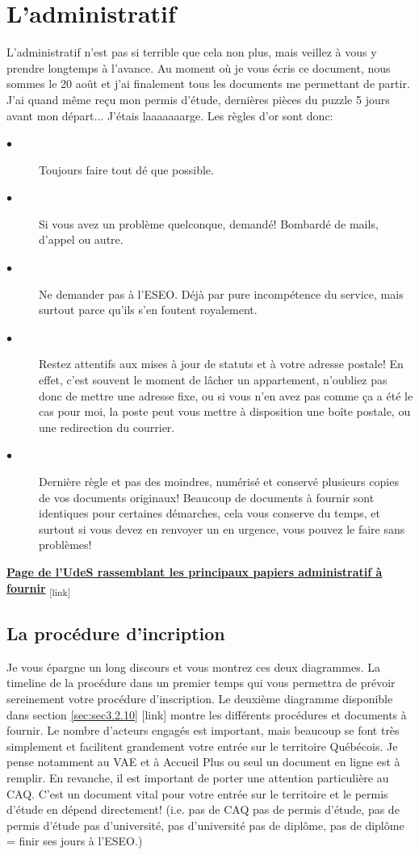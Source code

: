 \section{L'administratif}\label{sec:sec3.2}
L'administratif n'est pas si terrible que cela non plus, mais veillez à vous y prendre longtemps à l'avance. Au moment où je vous écris ce document, nous sommes le 20 août et j'ai finalement tous les documents me permettant de partir. J’ai quand même reçu mon permis d’étude, dernières pièces du puzzle 5 jours avant mon départ... J’étais laaaaaaarge. Les règles d’or sont donc:
\begin{description}
  \item[$\bullet$]Toujours faire tout dé que possible.
  \item[$\bullet$]Si vous avez un problème quelconque, demandé! Bombardé de mails, d'appel ou autre.
  \item[$\bullet$]Ne demander pas à l'ESEO. Déjà par pure incompétence du service, mais surtout parce qu'ils s'en foutent royalement.
  \item[$\bullet$]Restez attentifs aux mises à jour de statuts et à votre adresse postale!
  En effet, c’est souvent le moment de lâcher un appartement, n’oubliez pas donc de mettre une adresse fixe, ou si vous n’en avez pas comme ça a été le cas pour moi, la poste peut vous mettre à disposition une boîte postale, ou une redirection du courrier.
  \item[$\bullet$]Dernière règle et pas des moindres, numérisé et conservé plusieurs copies de vos documents originaux! Beaucoup de documents à fournir sont identiques pour certaines démarches, cela vous conserve du temps, et surtout si vous devez en renvoyer un en urgence, vous pouvez le faire sans problèmes!
\end{description}

\bigbreak
\href{https://www.usherbrooke.ca/etudiants-internationaux/fr/guide-daccueil/avant-votre-arrivee/papiers-legaux/}{\textbf{Page de l'UdeS rassemblant les principaux papiers administratif à fournir}}\textsubscript{  [link]}

\subsection{La procédure d'incription}\label{sec:sec3.2.1}
Je vous épargne un long discours et vous montrez ces deux diagrammes. La timeline de la procédure dans un premier temps qui vous permettra de prévoir sereinement votre procédure d'inscription. Le deuxième diagramme disponible dans section \ref{sec:sec3.2.10} [link] montre les différents procédures et documents à fournir. Le nombre d'acteurs engagés est important, mais beaucoup se font très simplement et facilitent grandement votre entrée sur le territoire Québécois. Je pense notamment au VAE et à Accueil Plus ou seul un document en ligne est à remplir.
En revanche, il est important de porter une attention particulière au CAQ. C'est un document vital pour votre entrée sur le territoire et le permis d'étude en dépend directement! (i.e. pas de CAQ pas de permis d'étude, pas de permis d'étude pas d'université, pas d'université pas de diplôme, pas de diplôme = finir ses jours à l'ESEO.)

